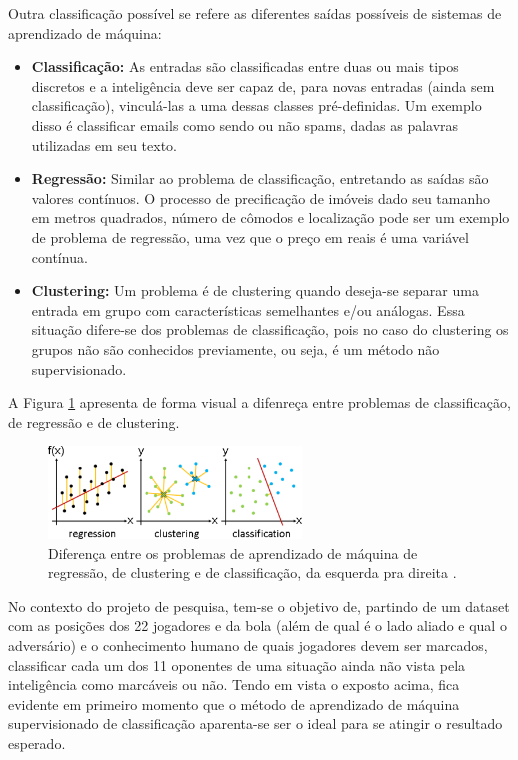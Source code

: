 \documentclass[a4paper,12pt]{article}
\begin{document}
Outra classificação possível se refere as diferentes saídas possíveis de sistemas de aprendizado de máquina:

\begin{itemize}
\item \textbf{Classificação:} As entradas são classificadas entre duas ou mais tipos discretos e a inteligência deve ser capaz de, para novas entradas (ainda sem classificação), vinculá-las a uma dessas classes pré-definidas. Um exemplo disso é classificar emails como sendo ou não spams, dadas as palavras utilizadas em seu texto.

\item \textbf{Regressão:} Similar ao problema de classificação, entretando as saídas são valores contínuos. O processo de precificação de imóveis dado seu tamanho em metros quadrados, número de cômodos e localização pode ser um exemplo de problema de regressão, uma vez que o preço em reais é uma variável contínua.

\item \textbf{Clustering:} Um problema é de clustering quando deseja-se separar uma entrada em grupo com características semelhantes e/ou análogas. Essa situação difere-se dos problemas de classificação, pois no caso do clustering os grupos não são conhecidos previamente, ou seja, é um método não supervisionado.
\end{itemize}

A Figura \ref{fig:reg-class-clust} apresenta de forma visual a difenreça entre problemas de classificação, de regressão e de clustering.

\begin{figure}[H]
	\centering
	\includegraphics[width=0.6\textwidth]{figures/reg-class-clust.png}
   \caption{Diferença entre os problemas de aprendizado de máquina de regressão, de clustering e de classificação, da esquerda pra direita \cite{diff-ml}.} \label{fig:reg-class-clust}
\end{figure}

No contexto do projeto de pesquisa, tem-se o objetivo de, partindo de um dataset com as posições dos 22 jogadores e da bola (além de qual é o lado aliado e qual o adversário) e o conhecimento humano de quais jogadores devem ser marcados, classificar cada um dos 11 oponentes de uma situação ainda não vista pela inteligência como marcáveis ou não. Tendo em vista o exposto acima, fica evidente em primeiro momento que o método de aprendizado de máquina supervisionado de classificação aparenta-se ser o ideal para se atingir o resultado esperado.
\end{document}
